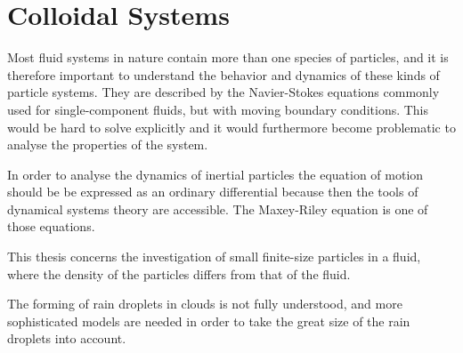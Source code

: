 \chapter{Colloidal Systems}



Most fluid systems in nature contain more than one species of particles, and it is therefore important to understand the behavior and dynamics of these kinds of particle systems. They are described by the Navier-Stokes equations commonly used for single-component fluids, but with moving boundary conditions. This would be hard to solve explicitly and it would furthermore become problematic to analyse the properties of the system.


In order to analyse the dynamics of inertial particles the equation of motion should be be expressed as an ordinary differential because then the tools of dynamical systems theory are accessible. The Maxey-Riley equation is one of those equations. 


This thesis concerns the investigation of small finite-size particles in a fluid, where the density of the 
particles differs from that of the fluid. 


The forming of rain droplets in clouds is not fully understood, and more sophisticated models are needed in order to take the great size of the rain droplets into account.




